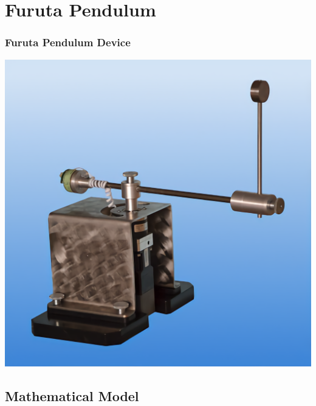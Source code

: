 \documentclass[]{beamer}
\begin{document}
\section{Furuta Pendulum}
\begin{frame}
	\frametitle{Furuta Pendulum Device}
	\centering
	\includegraphics[scale=0.5]{images/furutareal.png}
\end{frame}
\subsection{Mathematical Model}
\end{document}
